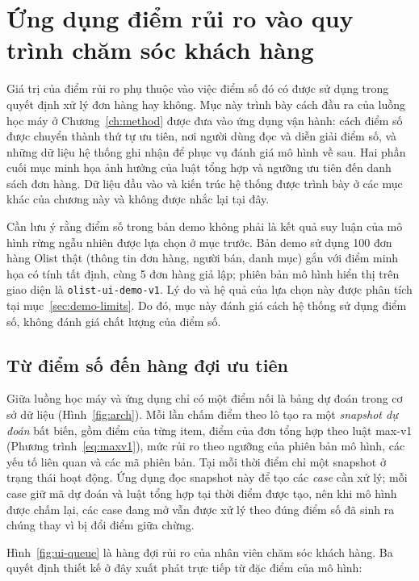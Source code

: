 \documentclass[12pt,a4paper]{report}
\begin{document}
\section{Ứng dụng điểm rủi ro vào quy trình chăm sóc khách hàng}\label{sec:demo}

Giá trị của điểm rủi ro phụ thuộc vào việc điểm số đó có được sử dụng trong quyết định xử lý đơn hàng hay không. Mục này trình bày cách đầu ra của luồng học máy ở Chương~\ref{ch:method} được đưa vào ứng dụng vận hành: cách điểm số được chuyển thành thứ tự ưu tiên, nơi người dùng đọc và diễn giải điểm số, và những dữ liệu hệ thống ghi nhận để phục vụ đánh giá mô hình về sau. Hai phần cuối mục minh họa ảnh hưởng của luật tổng hợp và ngưỡng ưu tiên đến danh sách đơn hàng. Dữ liệu đầu vào và kiến trúc hệ thống được trình bày ở các mục khác của chương này và không được nhắc lại tại đây.

Cần lưu ý rằng điểm số trong bản demo không phải là kết quả suy luận của mô hình rừng ngẫu nhiên được lựa chọn ở mục trước. Bản demo sử dụng 100 đơn hàng Olist thật (thông tin đơn hàng, người bán, danh mục) gắn với điểm minh họa có tính tất định, cùng 5 đơn hàng giả lập; phiên bản mô hình hiển thị trên giao diện là \texttt{olist-ui-demo-v1}. Lý do và hệ quả của lựa chọn này được phân tích tại mục~\ref{sec:demo-limits}. Do đó, mục này đánh giá cách hệ thống sử dụng điểm số, không đánh giá chất lượng của điểm số.

\subsection{Từ điểm số đến hàng đợi ưu tiên}

Giữa luồng học máy và ứng dụng chỉ có một điểm nối là bảng dự đoán trong cơ sở dữ liệu (Hình~\ref{fig:arch}). Mỗi lần chấm điểm theo lô tạo ra một \emph{snapshot dự đoán} bất biến, gồm điểm của từng item, điểm của đơn tổng hợp theo luật max-v1 (Phương trình~\ref{eq:maxv1}), mức rủi ro theo ngưỡng của phiên bản mô hình, các yếu tố liên quan và các mã phiên bản. Tại mỗi thời điểm chỉ một snapshot ở trạng thái hoạt động. Ứng dụng đọc snapshot này để tạo các \emph{case} cần xử lý; mỗi case giữ mã dự đoán và luật tổng hợp tại thời điểm được tạo, nên khi mô hình được chấm lại, các case đang mở vẫn được xử lý theo đúng điểm số đã sinh ra chúng thay vì bị đổi điểm giữa chừng.

Hình~\ref{fig:ui-queue} là hàng đợi rủi ro của nhân viên chăm sóc khách hàng. Ba quyết định thiết kế ở đây xuất phát trực tiếp từ đặc điểm của mô hình:
\end{document}
